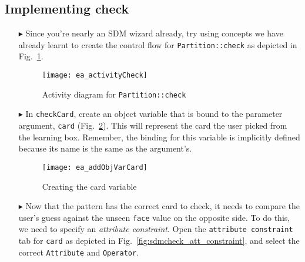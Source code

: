 \newpage
\hypertarget{checkCard vis}{}
\subsection{Implementing check}
\visHeader

\begin{itemize}

\vspace{1cm}

\item[$\blacktriangleright$] Since you're nearly an SDM wizard already, try using concepts we have already learnt to create the control flow for
\texttt{Partition::check} as depicted in Fig.~\ref{fig:sdm_check_start}.

\vspace{1cm}

\begin{figure}[htbp]
\begin{center}
  \texttt{[image: ea\_activityCheck]}
  \caption{Activity diagram for \texttt{Partition::check}}
  \label{fig:sdm_check_start}
\end{center}
\end{figure}

\vspace{1cm}

\item[$\blacktriangleright$] In \texttt{checkCard}, create an object variable that is bound to the parameter argument, \texttt{card} 
(Fig.~\ref{fig:sdm_check_addCard}). This will represent the card the user picked from the learning box. Remember, the binding for this variable is implicitly
defined because its name is the same as the argument's.

\begin{figure}[htbp]
\begin{center}
  \texttt{[image: ea\_addObjVarCard]}
  \caption{Creating the card variable}
  \label{fig:sdm_check_addCard}
\end{center}
\end{figure}

\clearpage

\item[$\blacktriangleright$] Now that the pattern has the correct card to check, it needs to compare the user's guess against the unseen \texttt{face} value on
the opposite side. To do this, we need to specify an \emph{attribute constraint}. Open the \texttt{attribute constraint} tab for \texttt{card} as depicted in
Fig.~\ref{fig:sdmcheck_att_constraint}, and select the correct \texttt{Attribute} and \texttt{Operator}.


\end{itemize}
